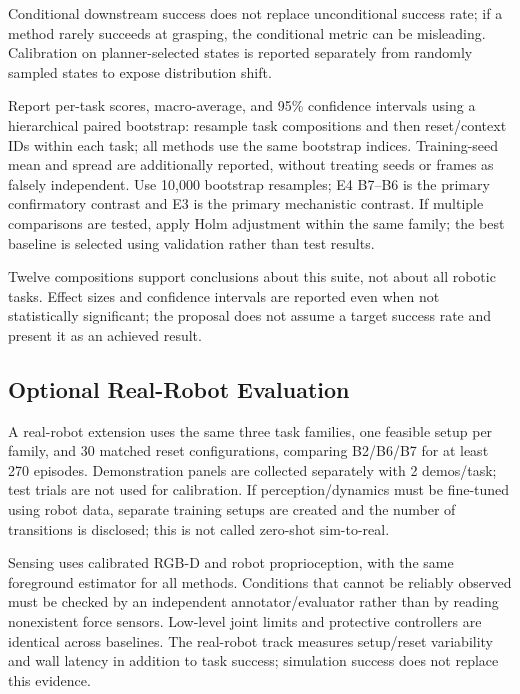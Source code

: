 \documentclass[
  10pt,
]{article}
\begin{document}
Conditional downstream success does not replace unconditional success rate; if a method rarely succeeds at grasping, the conditional metric can be misleading. Calibration on planner-selected states is reported separately from randomly sampled states to expose distribution shift.

Report per-task scores, macro-average, and 95\% confidence intervals using a hierarchical paired bootstrap: resample task compositions and then reset/context IDs within each task; all methods use the same bootstrap indices. Training-seed mean and spread are additionally reported, without treating seeds or frames as falsely independent. Use 10,000 bootstrap resamples; E4 B7--B6 is the primary confirmatory contrast and E3 is the primary mechanistic contrast. If multiple comparisons are tested, apply Holm adjustment within the same family; the best baseline is selected using validation rather than test results.

Twelve compositions support conclusions about this suite, not about all robotic tasks. Effect sizes and confidence intervals are reported even when not statistically significant; the proposal does not assume a target success rate and present it as an achieved result.

\hypertarget{tuxf9y-chux1ecdn-ux111uxe1nh-giuxe1-robot-thux1eadt}{%
\subsection{Optional Real-Robot Evaluation}\label{tuxf9y-chux1ecdn-ux111uxe1nh-giuxe1-robot-thux1eadt}}

A real-robot extension uses the same three task families, one feasible setup per family, and 30 matched reset configurations, comparing B2/B6/B7 for at least 270 episodes. Demonstration panels are collected separately with 2 demos/task; test trials are not used for calibration. If perception/dynamics must be fine-tuned using robot data, separate training setups are created and the number of transitions is disclosed; this is not called zero-shot sim-to-real.

Sensing uses calibrated RGB-D and robot proprioception, with the same foreground estimator for all methods. Conditions that cannot be reliably observed must be checked by an independent annotator/evaluator rather than by reading nonexistent force sensors. Low-level joint limits and protective controllers are identical across baselines. The real-robot track measures setup/reset variability and wall latency in addition to task success; simulation success does not replace this evidence.
\end{document}
